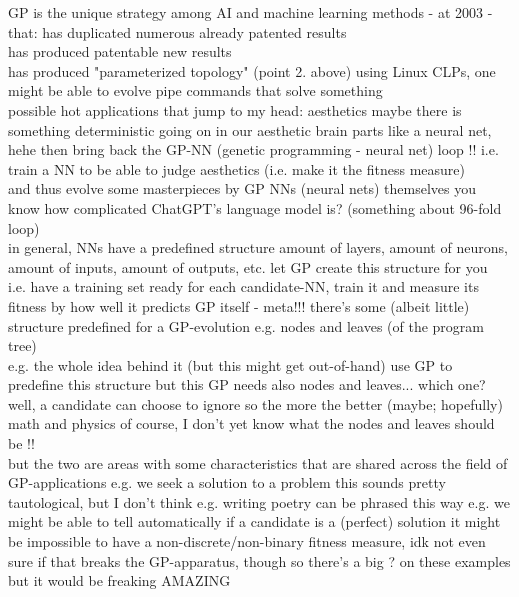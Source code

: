 \documentclass{article}\usepackage[margin=2cm]{geometry}
\begin{document}
\begin{cascade}
    GP is the unique strategy among AI and machine learning methods - at 2003 - that:
    \stepin
    has duplicated numerous already patented results\\
    has produced patentable new results\\
    has produced "parameterized topology" (point 2. above)
    \stepout
    \stepout
    using Linux CLPs, one might be able to evolve pipe commands that solve something\\
    possible hot applications that jump to my head:
    \stepin
    aesthetics
    \stepin
    maybe there is something deterministic going on in our aesthetic brain parts
    \stepin
    like a neural net, hehe
    \stepin
    then bring back the GP-NN (genetic programming - neural net) loop !!
    \stepin
    i.e. train a NN to be able to judge aesthetics (i.e. make it the fitness measure)\\
    and thus evolve some masterpieces by GP
    \stepout
    \stepout
    \stepout
    \stepout
    NNs (neural nets) themselves
    \stepin
    you know how complicated ChatGPT's language model is? (something about 96-fold loop)\\
    in general, NNs have a predefined structure
    \stepin
    amount of layers, amount of neurons, amount of inputs, amount of outputs, etc.
    \stepout
    let GP create this structure for you\\
    i.e. have a training set ready for each candidate-NN, train it and measure its fitness by how well it predicts
    \stepout
    GP itself - meta!!!
    \stepin
    there's some (albeit little) structure predefined for a GP-evolution
    \stepin
    e.g. nodes and leaves (of the program tree)\\
    e.g. the whole idea behind it (but this might get out-of-hand)
    \stepout
    use GP to predefine this structure
    \stepin
    but this GP needs also nodes and leaves... which one?\\
    well, a candidate can choose to ignore so the more the better (maybe; hopefully)
    \stepout
    \stepout
    math and physics
    \stepin
    of course, I don't yet know what the nodes and leaves should be !!\\
    but the two are areas with some characteristics that are shared across the field of GP-applications
    \stepin
    e.g. we seek a solution to a problem
    \stepin
    this sounds pretty tautological, but I don't think e.g. writing poetry can be phrased this way
    \stepout
    e.g. we might be able to tell automatically if a candidate is a (perfect) solution
    \stepout
    it might be impossible to have a non-discrete/non-binary fitness measure, idk
    \stepin
    not even sure if that breaks the GP-apparatus, though
    \stepout
    so there's a big ? on these examples
    \stepin
    but it would be freaking AMAZING
    \stepout
\end{cascade}
\end{document}
